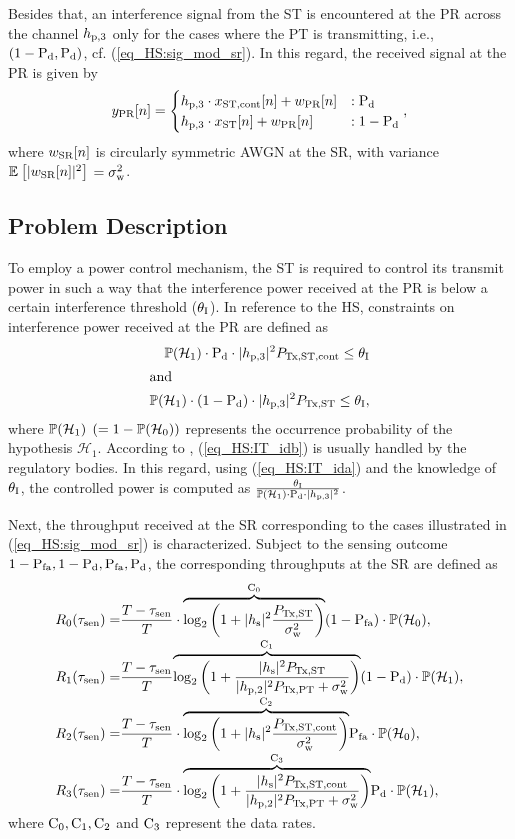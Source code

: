 Besides that, an interference signal from the ST is encountered at the PR across the channel $h_{\text{p,3}}$ only for the cases where the PT is transmitting, i.e., $(1 - \text{P}_{\text{d}}, \text{P}_{\text{d}})$, cf. (\ref{eq_HS:sig_mod_sr}). In this regard, the received signal at the PR is given by
\begin{equation}
y_{\text{PR}}[n] = 
\begin{cases}
h_{\text{p,3}} \cdot x_{\text{ST,cont}}[n] + w_{\text{PR}}[n] & : \text{P}_{\text{d}} \\
h_{\text{p,3}} \cdot x_{\text{ST}}[n] + w_{\text{PR}}[n] & : 1- \text{P}_{\text{d}} 
\end{cases},
\label{eq_HS:sig_mod_pr}
\end{equation}
where $w_{\text{SR}}[n]$ is circularly symmetric AWGN at the SR, with variance ${\mathbb E}_{}\left[ |w_{\text{SR}}[n]|^2 \right]$ $= \sigma^2_{\text{w}}$.

\subsection{Problem Description}
To employ a power control mechanism, the ST is required to control its transmit power in such a way that the interference power received at the PR is below a certain interference threshold ($\theta_{\text{I}}$). In reference to the HS, constraints on interference power received at the PR are defined as
\begin{align}
\mathbb P(\mathcal{H}_1) \cdot \text{P}_{\text{d}} \cdot |h_{\text{p,3}}|^2 P_{\text{Tx,ST,cont}} \le \theta_{\text{I}} \label{eq_HS:IT_ida} \\
\intertext{and   } 
\mathbb P(\mathcal{H}_1) \cdot (1 - \text{P}_{\text{d}}) \cdot |h_{\text{p,3}}|^2 P_{\text{Tx,ST}} \le \theta_{\text{I}} \label{eq_HS:IT_idb},
\end{align}
where $\mathbb P(\mathcal{H}_1)$ $(= 1 - \mathbb P(\mathcal{H}_0))$ represents the occurrence probability of the hypothesis $\mathcal H_1$. 
According to \cite{Sharma14}, (\ref{eq_HS:IT_idb}) is usually handled by the regulatory bodies. In this regard, using (\ref{eq_HS:IT_ida}) and the knowledge of $\theta_{\text{I}}$, the controlled power is computed as $\frac{\theta_{\text{I}}}{\mathbb P(\mathcal{H}_1) \cdot \text{P}_{\text{d}} \cdot |h_{\text{p,3}}|^2}$.

Next, the throughput received at the SR corresponding to the cases illustrated in (\ref{eq_HS:sig_mod_sr}) is characterized. Subject to the sensing outcome $1 - \text{P}_{\text{fa}}, 1 - \text{P}_{\text{d}}, \text{P}_{\text{fa}}, \text{P}_{\text{d}}$, the corresponding throughputs at the SR are defined as 
\begin{align}
R_{\text{0}}(\tau_{\text{sen}}) =& \frac{T- \tau_{\text{sen}}}{T} \cdot \smash[b]{\overbrace{\log_2 \left(1 + |h_{\text{s}}|^2 \frac{P_{\text{Tx,ST}}}{\sigma^2_{\text{w}}}\right)}^{\text{C}_{\text{0}}}} (1 - \text{P}_{\text{fa}} ) \cdot \mathbb P(\mathcal{H}_0),  \label{eq_HS:Cap0} \\ 
R_{\text{1}}(\tau_{\text{sen}}) =& \frac{T- \tau_{\text{sen}}}{T} \smash[b]{\overbrace{\log_2 \left(1 + \frac{|h_{\text{s}}|^2 P_{\text{Tx,ST}} }{|h_{\text{p,2}}|^2 P_{\text{Tx,PT}}  + \sigma^2_{\text{w}}} \right)}^{\text{C}_{\text{1}}}} (1 - \text{P}_{\text{d}}) \cdot \mathbb P(\mathcal{H}_1),  \label{eq_HS:Cap1} \\ 
R_{\text{2}}(\tau_{\text{sen}}) =& \frac{T- \tau_{\text{sen}}}{T} \cdot \smash[b]{\overbrace{\log_2 \left(1 + |h_{\text{s}}|^2 \frac{P_{\text{Tx,ST,cont}}}{\sigma^2_{\text{w}}}\right)}^{\text{C}_{\text{2}}}}  \text{P}_{\text{fa}} \cdot \mathbb P(\mathcal{H}_0),  \label{eq_HS:Cap2} \\ 
R_{\text{3}}(\tau_{\text{sen}}) =& \frac{T- \tau_{\text{sen}}}{T} \cdot \smash[b]{\overbrace{\log_2 \left(1 + \frac{|h_{\text{s}}|^2 P_{\text{Tx,ST,cont}} }{|h_{\text{p,2}}|^2 P_{\text{Tx,PT}}  + \sigma^2_{\text{w}}} \right)}^{\text{C}_{\text{3}}}} \text{P}_{\text{d}} \cdot \mathbb P(\mathcal{H}_1),  \label{eq_HS:Cap3}  
\end{align}
where $\text{C}_{\text{0}}, \text{C}_{\text{1}}, \text{C}_{\text{2}}$ and $\text{C}_{\text{3}}$ represent the data rates.


